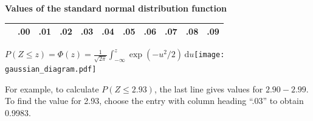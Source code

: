\documentclass[a4paper]{article}
\begin{document}
\begin{center}
  {\Large\bf Values of the standard normal distribution function}
\end{center}

\rule{0mm}{5mm}
\pagestyle{empty}
\thispagestyle{empty}
\begin{table}[ht]
\centering
\begin{tabular}{r|llllllllll}
  \hline \rule{0mm}{4mm}
  & {\large .00} & {\large .01} & {\large .02} & {\large .03} & {\large .04}
  & {\large .05} & {\large .06} & {\large .07} & {\large .08} & {\large .09}
  \vphantom{$y_{y_{y_y}}$} \\  \hline

  \hline
\end{tabular}
\end{table}

\noindent
\(\displaystyle P(Z\leqslant z)=\Phi(z)=\frac{1}{\sqrt{2\pi}}\int_{-\infty}^z\exp\left(-u^2/2\right)\,\mathrm{d}u\)\hfill\hbox{\texttt{[image: gaussian\_diagram.pdf]}}

\noindent For example, to calculate \(P(Z\leqslant 2.93)\), the last
line gives values for \(2.90-2.99\).  To find the value for 2.93,
choose the entry with column heading ``.03'' to obtain 0.9983.

\end{document}

